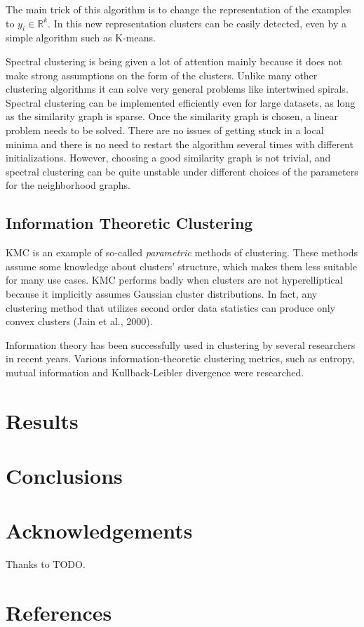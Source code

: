 \documentclass[conference]{IEEEtran}
\begin{document}
The main trick of this algorithm is to change the representation of the examples to $y_i \in \mathbb{R}^k$.
In this new representation clusters can be easily detected, even by a simple algorithm such as K-means.

Spectral clustering is being given a lot of attention mainly because it does not make strong
assumptions on the form of the clusters. Unlike many other clustering algorithms it
can solve very general problems like intertwined spirals.
Spectral clustering can be implemented efficiently even for large datasets, as long as
the similarity graph is sparse. Once the similarity graph is chosen, a linear problem needs to
be solved. There are no issues of getting stuck in a local minima and there is no need to
restart the algorithm several times with different initializations. However, choosing
a good similarity graph is not trivial, and spectral clustering can
be quite unstable under different choices of the parameters for the neighborhood graphs.

\subsection{Information Theoretic Clustering}%
KMC is an example of so-called \textit{parametric} methods of clustering. These
methods assume some knowledge about clusters' structure, which makes them less
suitable for many use cases. KMC performs badly when clusters are not hyperelliptical
because it implicitly assumes Gaussian cluster distributions. In fact, any clustering method
that utilizes second order data statistics can produce only convex clusters (Jain et al., 2000).

Information theory has been successfully used in clustering by several researchers in recent years.
Various information-theoretic clustering metrics, such as entropy, mutual information and
Kullback-Leibler divergence were researched.

\section{Results}

\section{Conclusions}

\section*{Acknowledgements}
Thanks to TODO.

\section*{References}
\end{document}
